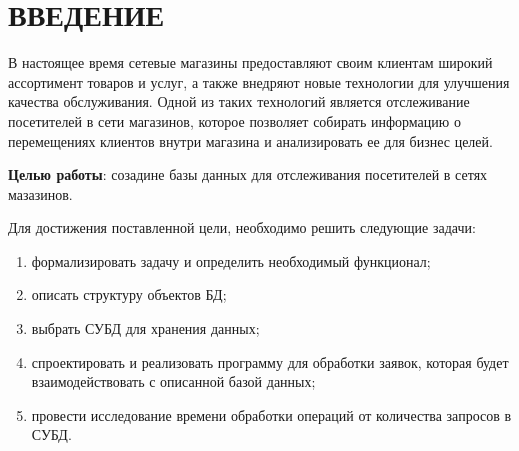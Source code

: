 \section*{ВВЕДЕНИЕ}

В настоящее время сетевые магазины предоставляют своим клиентам широкий ассортимент
товаров и услуг, а также внедряют новые технологии для улучшения качества обслуживания.
Одной из таких технологий является отслеживание посетителей в сети магазинов,
которое позволяет собирать информацию о перемещениях клиентов внутри магазина и анализировать
ее для бизнес целей.

\textbf{Целью работы}: созадине базы данных для отслеживания посетителей в сетях мазазинов.


Для достижения поставленной цели, необходимо решить следующие задачи:
\begin{enumerate}[label=\arabic*.]
	\item формализировать задачу и определить необходимый функционал;
	\item описать структуру объектов БД;
	\item выбрать СУБД для хранения данных;
	\item спроектировать и реализовать программу для обработки заявок, которая будет взаимодействовать с описанной базой данных; 
	\item провести исследование времени обработки операций от количества запросов в СУБД.
\end{enumerate}
